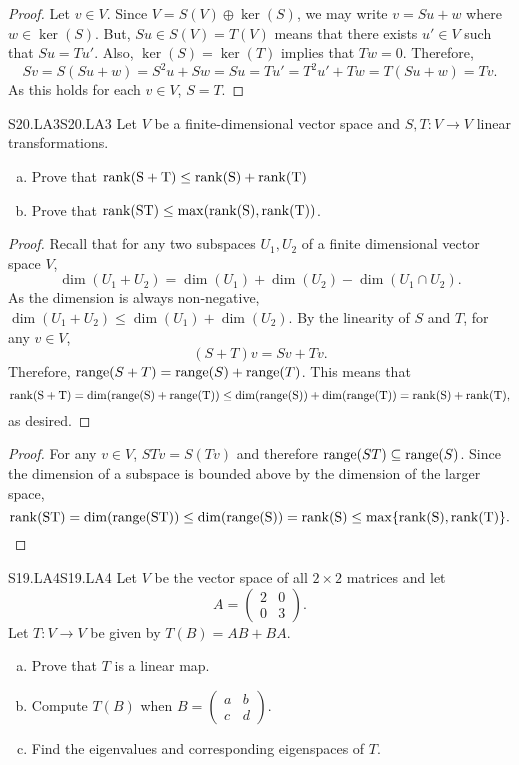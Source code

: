 \documentclass[../AlgebraQualSolutions.tex]{subfiles}
\begin{document}
	\begin{proof}
		Let $v \in V$. Since $V = S(V) \oplus \ker(S)$, we may write $v = Su + w$ where $w \in \ker(S)$. But, $Su \in S(V) = T(V)$ means that there exists $u' \in V$ such that $Su = Tu'$. Also, $\ker(S) = \ker(T)$ implies that $Tw = 0$. Therefore,
			\[Sv = S(Su + w) = S^2u + Sw = Su = Tu' = T^2u' + Tw = T(Su + w) = Tv.\]
		As this holds for each $v \in V$, $S = T$.
	\end{proof}

	\begin{prob}{S20.LA3}{S20.LA3}
		Let $V$ be a finite-dimensional vector space and $S,T: V \to V$ linear transformations.
		\begin{enumerate}[(a)]
			\item Prove that $\rm{rank}(S+T) \leq \rm{rank}(S) + \rm{rank}(T)$
			\item Prove that $\rm{rank}(ST) \leq \max(\rm{rank}(S), \rm{rank}(T))$.
		\end{enumerate}
	\end{prob}

	\begin{proof}
		Recall that for any two subspaces $U_1,U_2$ of a finite dimensional vector space $V$,
			\[\dim(U_1 + U_2) = \dim(U_1) + \dim(U_2) - \dim(U_1 \cap U_2).\]
		As the dimension is always non-negative, $\dim(U_1 + U_2) \leq \dim(U_1) + \dim(U_2)$. By the linearity of $S$ and $T$, for any $v \in V$,
			\[(S + T)v = Sv + Tv.\]
		Therefore, $\mathrm{range}(S + T) = \mathrm{range}(S) + \mathrm{range}(T)$. This means that
			\[\rm{rank}(S+T) = \dim(\mathrm{range}(S) + \mathrm{range}(T)) \leq \dim(\mathrm{range}(S)) + \dim(\mathrm{range}(T)) = \rm{rank}(S) + \rm{rank}(T),\]
		as desired.
	\end{proof}

	\begin{proof}
		For any $v \in V$, $STv = S(Tv)$ and therefore $\mathrm{range}(ST) \subseteq \mathrm{range}(S)$. Since the dimension of a subspace is bounded above by the dimension of the larger space,
			\[\rm{rank}(ST) = \dim(\mathrm{range}(ST)) \leq \dim(\mathrm{range}(S)) = \rm{rank}(S) \leq \max\{\rm{rank}(S),\rm{rank}(T)\}.\]
	\end{proof}

	\begin{prob}{S19.LA4}{S19.LA4}
		Let $V$ be the vector space of all $2 \times 2$ matrices and let 
			\[A = \begin{pmatrix} 2 & 0\\ 0 & 3 \end{pmatrix}. \]
		Let $T: V \to V$ be given by $T(B) = AB + BA$.

		\begin{enumerate}[(a)]
			\item Prove that $T$ is a linear map.
			\item Compute $T(B)$ when $B = \begin{pmatrix} a & b \\ c & d \end{pmatrix}$.
			\item Find the eigenvalues and corresponding eigenspaces of $T$.
		\end{enumerate}
	\end{prob}
\end{document}
